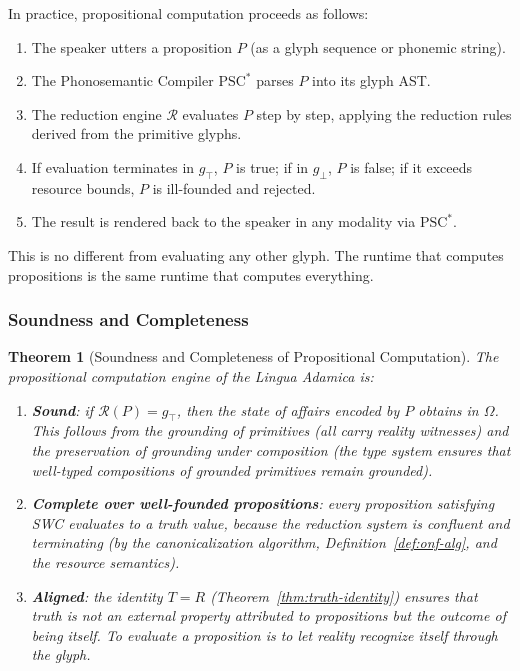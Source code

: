 \documentclass[12pt, letterpaper]{book}
\def\equiv{=}%
\def\mathfrak#1{#1}%
\newtheorem{theorem}{Theorem}[chapter]
\begin{document}
In practice, propositional computation proceeds as follows:

\begin{enumerate}
    \item The speaker utters a proposition $P$ (as a glyph sequence or phonemic string).
    \item The Phonosemantic Compiler $\mathrm{PSC}^*$ parses $P$ into its glyph AST.
    \item The reduction engine $\mathcal{R}$ evaluates $P$ step by step, applying the reduction rules derived from the primitive glyphs.
    \item If evaluation terminates in $\mathfrak{g}_\top$, $P$ is true; if in $\mathfrak{g}_\bot$, $P$ is false; if it exceeds resource bounds, $P$ is ill-founded and rejected.
    \item The result is rendered back to the speaker in any modality via $\mathrm{PSC}^*$.
\end{enumerate}

This is no different from evaluating any other glyph. The runtime that computes propositions is the same runtime that computes everything.

\subsubsection{Soundness and Completeness}

\begin{theorem}[Soundness and Completeness of Propositional Computation]\label{thm:prop-comp}
The propositional computation engine of the Lingua Adamica is:
\begin{enumerate}[label=(\roman*)]
    \item \textbf{Sound}: if $\mathcal{R}(P) = \mathfrak{g}_\top$, then the state of affairs encoded by $P$ obtains in $\Omega$. This follows from the grounding of primitives (all carry reality witnesses) and the preservation of grounding under composition (the type system ensures that well-typed compositions of grounded primitives remain grounded).
    \item \textbf{Complete over well-founded propositions}: every proposition satisfying SWC evaluates to a truth value, because the reduction system is confluent and terminating (by the canonicalization algorithm, Definition~\ref{def:onf-alg}, and the resource semantics).
    \item \textbf{Aligned}: the identity $T \equiv R$ (Theorem~\ref{thm:truth-identity}) ensures that truth is not an external property attributed to propositions but the outcome of being itself. To evaluate a proposition is to let reality recognize itself through the glyph.
\end{enumerate}
\end{theorem}
\end{document}
